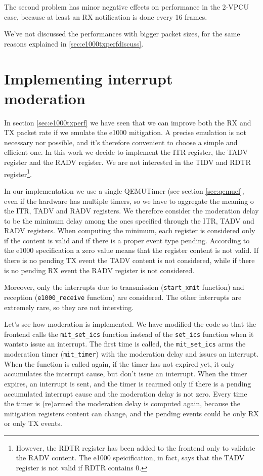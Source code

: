The second problem has minor negative effects on performance in the 2-VPCU case, because at least an RX notification is done every
16 frames.

\vspace{0.5cm}

We've not discussed the performances with bigger packet sizes, for the same reasons explained in \ref{sec:e1000txperfdiscuss}.



\section{Implementing interrupt moderation}
\label{sec:e1000-mit}
In section \ref{sec:e1000txperf} we have seen that we can improve both the RX and TX packet rate if we emulate the e1000 mitigation.
A precise emulation is not necessary nor possible, and it's therefore convenient to choose a simple and efficient one.
In this work we decide to implement the ITR register, the TADV register and the RADV register.
We are not interested in the TIDV and RDTR register\footnote{However, the RDTR register has been added to the frontend only to 
validate the RADV content. The e1000 speicification, in fact, says that the TADV register is not valid if RDTR contains 0.}.

\vspace{0.5cm}

In our implementation we use a single QEMUTimer (see section \ref{sec:qemuel}, even if the hardware has multiple timers, so we have to 
aggregate the meaning o the ITR, TADV and RADV registers.
We therefore consider the moderation delay to be the minimum delay among the ones specified through the ITR, TADV and RADV registers.
When computing the minimum, each register is considered only if the content is valid and if there is a proper event type pending.
According to the e1000 specification a zero value means that the register content is not valid. If there is no pending TX event
the TADV content is not considered, while if there is no pending RX event the RADV register is not considered.

Moreover, only the interrupts due to transmission (\texttt{start\_xmit} function) and reception (\texttt{e1000\_receive}
function) are considered. The other interrupts are extremely rare, so they are not intersting.


\vspace{0.5cm}
Let's see how moderation is implemented. We have modified the code so that the frontend calls the \texttt{mit\_set\_ics} function instead
of the \texttt{set\_ics} function when it wantsto issue an interrupt.
The first time is called, the \texttt{mit\_set\_ics} arms the moderation timer (\texttt{mit\_timer}) with the moderation delay and issues 
an interrupt.
When the function is called again, if the timer has not expired yet, it only accumulates the interrupt cause, but don't issue an interrupt.
When the timer expires, an interrupt is sent, and the timer is rearmed only if there is a pending accumulated interrupt cause and
the moderation delay is not zero.
Every time the timer is (re)armed the moderation delay is computed again, because the mitigation registers content can change, and
the pending events could be only RX or only TX events.

